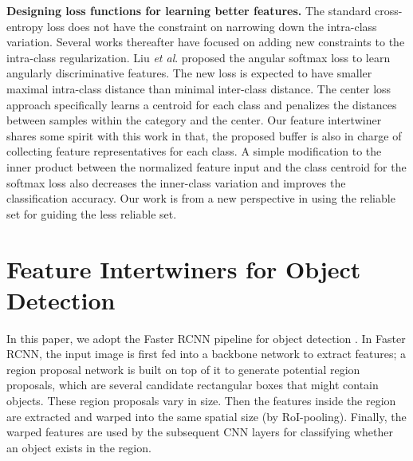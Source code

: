 \documentclass{article} \usepackage{iclr2019_conference,times}
\begin{document}
\textbf{Designing loss functions for learning better features.} The standard cross-entropy loss does not have the constraint on narrowing down the intra-class variation. 
Several works thereafter have focused on adding new constraints to the intra-class regularization.
Liu \textit{et al}. \citep{liu2017_spherical_loss} proposed the angular softmax loss to learn angularly discriminative features. The new loss is expected to have smaller maximal intra-class distance than
minimal inter-class distance. 
The center loss \citep{wen2016_center_loss} approach specifically learns a centroid for each class and penalizes the distances between samples within the category and the center. Our feature intertwiner shares some spirit with this work in that, the proposed buffer is also in charge of collecting feature representatives for each class. A simple modification \citep{liu2017_coco_v2} to the inner product between the normalized feature input and the class centroid for the softmax loss also decreases the inner-class variation and improves the classification accuracy. Our work is from a new perspective in using the reliable set for guiding the less reliable set.
 





\section{Feature Intertwiners for Object Detection}





In this paper, we adopt the Faster RCNN pipeline for object detection \citep{he2016_resnet,he2017_mask_rcnn,ross15_fast_rcnn}. In Faster RCNN, the input image is first fed into a backbone network to extract features; a region proposal network \citep{ren2015_faster_rcnn} is built on top of it to generate potential region proposals, which are several candidate rectangular boxes that might contain objects. These region proposals vary in size. Then the features inside the region are extracted and warped into the same spatial size (by RoI-pooling). Finally, the warped features are used by the subsequent CNN layers for classifying whether an object exists in the region. 
\end{document}
